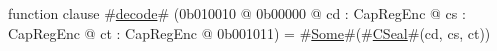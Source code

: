 function clause #\hyperref[sailMIPSzdecode]{decode}# (0b010010 @ 0b00000 @ cd : CapRegEnc @ cs : CapRegEnc @ ct : CapRegEnc @ 0b001011) = #\hyperref[sailMIPSzSome]{Some}#(#\hyperref[sailMIPSzCSeal]{CSeal}#(cd, cs, ct))
